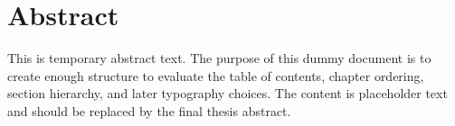 \chapter*{Abstract}

This is temporary abstract text. The purpose of this dummy document is to create enough structure to evaluate the table of contents, chapter ordering, section hierarchy, and later typography choices. The content is placeholder text and should be replaced by the final thesis abstract.
